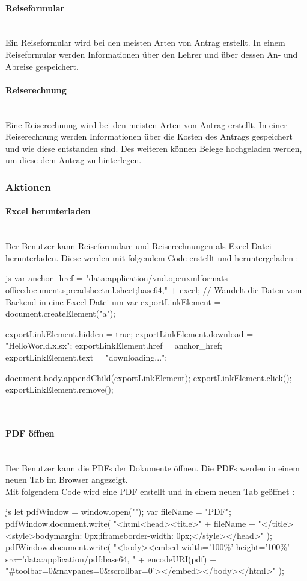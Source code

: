 \paragraph{Reiseformular}~\\
Ein Reiseformular wird bei den meisten Arten von Antrag erstellt. In einem Reiseformular werden Informationen über den Lehrer und über dessen An- und Abreise gespeichert.
\paragraph{Reiserechnung}~\\
Eine Reiserechnung wird bei den meisten Arten von Antrag erstellt. In einer Reiserechnung werden Informationen über die Kosten des Antrags gespeichert und wie diese entstanden sind. Des weiteren können Belege hochgeladen werden, um diese dem Antrag zu hinterlegen.
\subsubsection{Aktionen}
\paragraph{Excel herunterladen}~\\
Der Benutzer kann Reiseformulare und Reiserechnungen als Excel-Datei herunterladen. Diese werden mit folgendem Code erstellt und heruntergeladen \cite{down_excel}:
\begin{code}{js}
	var anchor_href =
	"data:application/vnd.openxmlformats-officedocument.spreadsheetml.sheet;base64," +
	excel;	// Wandelt die Daten vom Backend in eine Excel-Datei um
	var exportLinkElement = document.createElement("a");
	
	exportLinkElement.hidden = true;
	exportLinkElement.download = "HelloWorld.xlsx";
	exportLinkElement.href = anchor_href;
	exportLinkElement.text = "downloading...";
	
	document.body.appendChild(exportLinkElement);
	exportLinkElement.click();
	exportLinkElement.remove();
\end{code}
~\\
\paragraph{PDF öffnen}~\\
Der Benutzer kann die PDFs der Dokumente öffnen. Die PDFs werden in einem neuen Tab im Browser angezeigt.\\
Mit folgendem Code wird eine PDF erstellt und in einem neuen Tab geöffnet \cite{sof_pdf}:
\begin{code}{js}
	let pdfWindow = window.open("");
	var fileName = "PDF";
	pdfWindow.document.write(
	"<html<head><title>" +
	fileName +
	"</title><style>body{margin: 0px;}iframe{border-width: 0px;}</style></head>"
	);
	pdfWindow.document.write(
	"<body><embed width='100\%' height='100\%' src='data:application/pdf;base64, " +
	encodeURI(pdf) +
	"#toolbar=0\&navpanes=0\&scrollbar=0'></embed></body></html>"
	);
\end{code}
~\\
